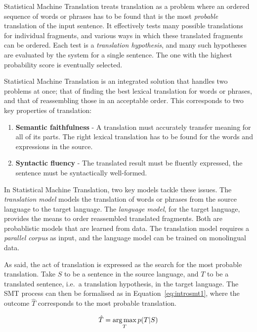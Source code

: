 Statistical Machine Translation treats translation as a problem where an
ordered sequence of words or phrases has to be found that is the most
\emph{probable} translation of the input sentence. It effectively tests many possible
translations for individual fragments, and various ways in which these
translated fragments can be ordered. Each test is a \emph{translation
hypothesis}, and many such hypotheses are evaluated by the system
for a single sentence. The one with the highest probability score is eventually
selected.

Statistical Machine Translation is an integrated solution that handles two
problems at once; that of finding the best lexical translation for words or
phrases, and that of reassembling those in an acceptable order. This corresponds to
two key properties of translation:

\begin{enumerate}
	\item \textbf{Semantic faithfulness} - A translation must accurately transfer meaning for all of its parts. The right lexical translation has to be found for the words and expressions in the source.
	\item \textbf{Syntactic fluency} - The translated result must be fluently
        expressed, the sentence must be syntactically well-formed.
\end{enumerate}

In Statistical Machine Translation, two key models tackle these issues. The
\emph{translation model} models the translation of words or phrases from the
source language to the target language. The \emph{language model}, for the
target language, provides the means to order reassembled translated fragments. Both
are probablistic models that are learned from data. The translation model
requires a \emph{parallel corpus} as input, and the language model can be
trained on monolingual data.

As said, the act of translation is expressed as the search for the most
probable translation. Take $S$ to be a sentence in the source language, and $T$
to be a translated sentence, i.e.\ a translation hypothesis, in the target
language. The SMT process can then be formalised as in
Equation~\ref{eq:introsmt1}, where the outcome $\hat{T}$ corresponds to the most probable translation.

\begin{equation}
\hat{T} = \operatorname*{arg\,max}_T p(T|S)
\label{eq:introsmt1}
\end{equation}


